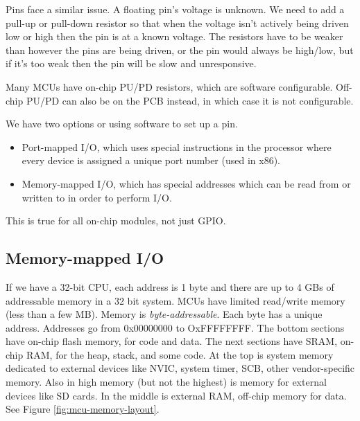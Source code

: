 Pins face a similar issue. A floating pin's voltage is unknown.
We need to add a pull-up or pull-down resistor so that when the
voltage isn't actively being driven low or high then the pin is
at a known voltage. The resistors have to be weaker than however
the pins are being driven, or the pin would always be high/low,
but if it's too weak then the pin will be slow and unresponsive.

Many MCUs have on-chip PU/PD resistors, which are software configurable.
Off-chip PU/PD can also be on the PCB instead, in which case it is
not configurable.

We have two options or using software to set up a pin.
\begin{itemize}
    \item Port-mapped I/O, which uses special instructions in the processor
          where every device is assigned a unique port number (used in x86).
    \item Memory-mapped I/O, which has special addresses which can be read
          from or written to in order to perform I/O.
\end{itemize}
This is true for all on-chip modules, not just GPIO.

\subsection{Memory-mapped I/O}
If we have a 32-bit CPU, each address is 1 byte and there are up
to 4 GBs of addressable memory in a 32 bit system.
MCUs have limited read/write memory (less than a few MB).
Memory is \emph{byte-addressable}. Each byte has a unique address.
Addresses go from 0x00000000 to OxFFFFFFFF. The bottom sections have
on-chip flash memory, for code and data. The next sections have SRAM,
on-chip RAM, for the heap, stack, and some code. At the top is system
memory dedicated to external devices like NVIC, system timer, SCB, other
vendor-specific memory. Also in high memory (but not the highest) is
memory for external devices like SD cards. In the middle is external
RAM, off-chip memory for data. See Figure \ref{fig:mcu-memory-layout}.

